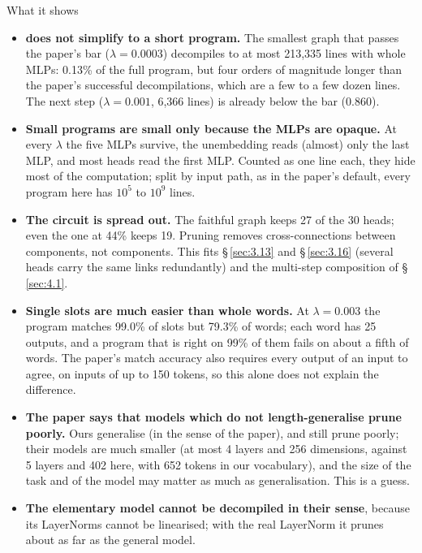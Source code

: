 \documentclass[paper=a4,fontsize=11pt,DIV=11,parskip=half,headings=small,numbers=noendperiod]{scrartcl}
\DeclareRobustCommand{\lead}[1]{\textsf{\bfseries\color{accent}#1}}
\DeclareRobustCommand{\code}[1]{{\fontseries{m}\ttfamily #1}}
\begin{document}
\begin{findbox}{What it shows}
\begin{itemize}
\item \lead{\code{torn-\allowbreak{}bigger-\allowbreak{}13} does not simplify to a short program.} The smallest
  graph that passes the paper’s bar ($\lambda=0.0003$) decompiles to at most 213,335 lines with whole MLPs:
  0.13\% of the full program, but four orders of magnitude longer than the paper’s successful decompilations,
  which are a few to a few dozen lines. The next step ($\lambda=0.001$, 6,366 lines) is already below the bar
  (0.860).
\item \lead{Small programs are small only because the MLPs are opaque.} At every $\lambda$ the five MLPs
  survive, the unembedding reads (almost) only the last MLP, and most heads read the first MLP. Counted as one
  line each, they hide most of the computation; split by input path, as in the paper’s default, every program
  here has $10^{5}$ to $10^{9}$ lines.
\item \lead{The circuit is spread out.} The faithful graph keeps 27 of the 30 heads; even the one at 44\% keeps
  19. Pruning removes cross-connections between components, not components. This fits \S\,\ref{sec:3.13} and
  \S\,\ref{sec:3.16} (several heads carry the same links redundantly) and the multi-step composition of
  \S\,\ref{sec:4.1}.
\item \lead{Single slots are much easier than whole words.} At $\lambda=0.003$ the program matches 99.0\% of
  slots but 79.3\% of words; each word has 25 outputs, and a program that is right on 99\% of them fails on
  about a fifth of words. The paper’s match accuracy also requires every output of an input to agree, on inputs
  of up to 150 tokens, so this alone does not explain the difference.
\item \lead{The paper says that models which do not length-generalise prune poorly.} Ours generalise (in the
  sense of the paper), and still prune poorly; their models are much smaller (at most 4 layers and 256
  dimensions, against 5 layers and 402 here, with 652 tokens in our vocabulary), and the size of the task and of
  the model may matter as much as generalisation. This is a guess.
\item \lead{The elementary model cannot be decompiled in their sense}, because its LayerNorms cannot be
  linearised; with the real LayerNorm it prunes about as far as the general model.
\end{itemize}
\end{findbox}
\end{document}
